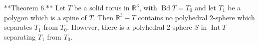 **Theorem 6.** Let $T$ be a solid torus in $\mathbb{R}^3$, with $\operatorname{Bd} T = T_0$ and let $T_1$ be a polygon which is a spine of $T$. Then $\mathbb{R}^3 - T$ contains no polyhedral 2-sphere which separates $T_1$ from $T_0$. However, there is a polyhedral 2-sphere $S$ in $\operatorname{Int} T$ separating $T_1$ from $T_0$.
